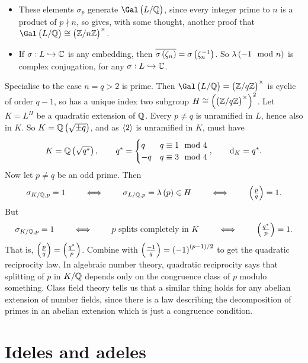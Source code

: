 
\begin{remark*}
\hfill
\begin{itemize}
\item These elements $ \sigma_p $ generate $ \Gal\br{L / \QQ} $, since every integer prime to $ n $ is a product of $ p \nmid n $, so gives, with some thought, another proof that $ \Gal\br{L / \QQ} \cong \br{\ZZ / n\ZZ}^\times $.
\item If $ \sigma : L \hookrightarrow \mathbb{C} $ is any embedding, then $ \overline{\sigma\br{\zeta_n}} = \sigma\br{\zeta_n^{-1}} $. So $ \lambda\br{-1 \mod n} $ is complex conjugation, for any $ \sigma : L \hookrightarrow \mathbb{C} $.
\end{itemize}
\end{remark*}

Specialise to the case $ n = q > 2 $ is prime. Then $ \Gal\br{L / \QQ} = \br{\ZZ / q\ZZ}^\times $ is cyclic of order $ q - 1 $, so has a unique index two subgroup $ H \cong \br{\br{\ZZ / q\ZZ}^\times}^2 $. Let $ K = L^H $ be a quadratic extension of $ \mathbb{Q} $. Every $ p \ne q $ is unramified in $ L $, hence also in $ K $. So $ K = \QQ\br{\sqrt{\pm q}} $, and as $ \left\langle 2 \right\rangle $ is unramified in $ K $, must have
$$ K = \QQ\br{\sqrt{q^*}}, \qquad q^* =
\begin{cases}
q & q \equiv 1 \mod 4 \\
-q & q \equiv 3 \mod 4
\end{cases},
\qquad \d_K = q^*. $$
Now let $ p \ne q $ be an odd prime. Then
$$ \sigma_{K / \QQ, p} = 1 \qquad \iff \qquad \sigma_{L / \QQ, p} = \lambda\br{p} \in H \qquad \iff \qquad \br{\tfrac{p}{q}} = 1. $$
But
$$ \sigma_{K / \QQ, p} = 1 \qquad \iff \qquad p \ \text{splits completely in} \ K \qquad \iff \qquad \br{\tfrac{q^*}{p}} = 1. $$
That is, $ \br{\tfrac{p}{q}} = \br{\tfrac{q^*}{p}} $. Combine with $ \br{\tfrac{-1}{q}} = \br{-1}^{\br{p - 1} / 2} $ to get the quadratic reciprocity law. In algebraic number theory, quadratic reciprocity says that splitting of $ p $ in $ K / \mathbb{Q} $ depends only on the congruence class of $ p $ modulo something. Class field theory tells us that a similar thing holds for any abelian extension of number fields, since there is a law describing the decomposition of primes in an abelian extension which is just a congruence condition.

\pagebreak

\section{Ideles and adeles}

